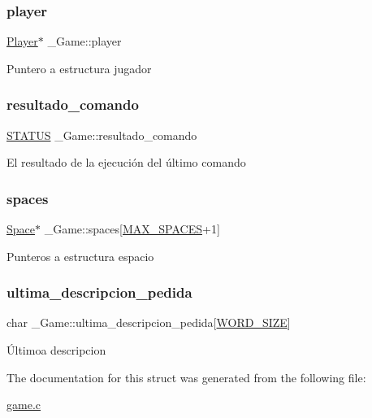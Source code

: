 \subsubsection{\texorpdfstring{player}{player}}
{\footnotesize\ttfamily \hyperlink{player_8h_af30e2030635a69690f85e48bc6ef202f}{Player}$\ast$ \+\_\+\+Game\+::player}

Puntero a estructura jugador \mbox{\label{struct__Game_ae5043c90b0187cdcef87720f6cdef4ce}} 
\subsubsection{\texorpdfstring{resultado\+\_\+comando}{resultado\_comando}}
{\footnotesize\ttfamily \hyperlink{types_8h_a32c27cc471df37f4fc818d65de0a56c4}{S\+T\+A\+T\+US} \+\_\+\+Game\+::resultado\+\_\+comando}

El resultado de la ejecución del último comando \mbox{\label{struct__Game_ab4180417d9148f8abb2233ca6c4ecfe5}} 
\subsubsection{\texorpdfstring{spaces}{spaces}}
{\footnotesize\ttfamily \hyperlink{space_8h_a67533ffc2b70463baecc38fb0629bbfc}{Space}$\ast$ \+\_\+\+Game\+::spaces\mbox{[}\hyperlink{space_8h_a5f54fd55f983a2e33ce076cd9f587e82}{M\+A\+X\+\_\+\+S\+P\+A\+C\+ES}+1\mbox{]}}

Punteros a estructura espacio \mbox{\label{struct__Game_ada8be61bb88218238ba6d17918b199aa}} 
\subsubsection{\texorpdfstring{ultima\+\_\+descripcion\+\_\+pedida}{ultima\_descripcion\_pedida}}
{\footnotesize\ttfamily char \+\_\+\+Game\+::ultima\+\_\+descripcion\+\_\+pedida\mbox{[}\hyperlink{types_8h_a92ed8507d1cd2331ad09275c5c4c1c89}{W\+O\+R\+D\+\_\+\+S\+I\+ZE}\mbox{]}}

Últimoa descripcion 

The documentation for this struct was generated from the following file\+:\begin{DoxyCompactItemize}
\item 
\hyperlink{game_8c}{game.\+c}\end{DoxyCompactItemize}
